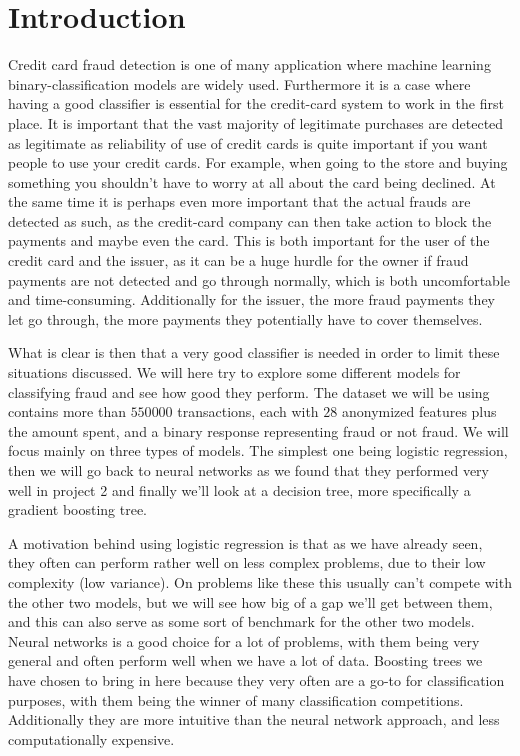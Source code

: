 \documentclass{article}
\begin{document}
\section{Introduction}
Credit card fraud detection is one of many application where machine learning
binary-classification models are widely used. Furthermore it is a case where
having a good classifier is essential for the credit-card system to work in the
first place. It is important that the vast majority of legitimate purchases are
detected as legitimate as reliability of use of credit cards is quite important
if you want people to use your credit cards. For example, when going to the
store and buying something you shouldn't have to worry at all about the card being
declined. At the same time it is perhaps even more important that the actual
frauds are detected as such, as the credit-card company can then take action to
block the payments and maybe even the card. This is both important for the user
of the credit card and the issuer, as it can be a huge hurdle for the owner if
fraud payments are not detected and go through normally, which is both
uncomfortable and time-consuming. Additionally for the issuer, the more fraud
payments they let go through, the more payments they potentially have to cover
themselves.

What is clear is then that a very good classifier is needed in order to limit
these situations discussed. We will here try to explore some different models
for classifying fraud and see how good they perform. The dataset we will be
using contains more than $550 000$ transactions, each with $28$ anonymized
features plus the amount spent, and a binary response representing fraud or not
fraud. We will focus mainly on three types of models. The simplest one being
logistic regression, then we will go back to neural networks as we found that
they performed very well in project 2 \cite{githubrepoproject2} and finally
we'll look at a decision tree, more specifically a gradient boosting tree.

A motivation behind using logistic regression is that as we have already seen,
they often can perform rather well on less complex problems, due to their low
complexity (low variance). On problems like these this usually can't compete
with the other two models, but we will see how big of a gap we'll get between
them, and this can also serve as some sort of benchmark for the other two
models. Neural networks is a good choice for a lot of problems, with them being
very general and often perform well when we have a lot of data. Boosting trees
we have chosen to bring in here because they very often are a go-to for
classification purposes, with them being the winner of many classification
competitions. Additionally they are more intuitive than the neural network
approach, and less computationally expensive.
\end{document}
